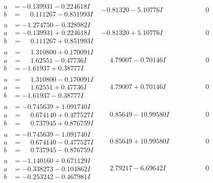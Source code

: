 \documentclass[1p]{elsarticle_modified}
\theoremstyle{definition}
\begin{document}
$$\begin{array}{c|c|c}
\begin{aligned}
a &= -0.139931 - 0.224618 I \\
b &= \phantom{-}0.111267 - 0.851993 I\end{aligned}
 & -0.81320 - 5.10776 I & \phantom{-0.000000 } 0 \\ \hline\begin{aligned}
u &= -1.274750 - 0.328982 I \\
a &= -0.139931 + 0.224618 I \\
b &= \phantom{-}0.111267 + 0.851993 I\end{aligned}
 & -0.81320 + 5.10776 I & \phantom{-0.000000 } 0 \\ \hline\begin{aligned}
u &= \phantom{-}1.310800 + 0.170091 I \\
a &= \phantom{-}1.62551 - 0.47736 I \\
b &= -1.61937 + 0.38777 I\end{aligned}
 & \phantom{-}4.79007 - 0.70146 I & \phantom{-0.000000 } 0 \\ \hline\begin{aligned}
u &= \phantom{-}1.310800 - 0.170091 I \\
a &= \phantom{-}1.62551 + 0.47736 I \\
b &= -1.61937 - 0.38777 I\end{aligned}
 & \phantom{-}4.79007 + 0.70146 I & \phantom{-0.000000 } 0 \\ \hline\begin{aligned}
u &= -0.745639 + 1.091740 I \\
a &= \phantom{-}0.674140 + 0.477527 I \\
b &= \phantom{-}0.737945 + 0.876759 I\end{aligned}
 & \phantom{-}0.85649 - 10.99580 I & \phantom{-0.000000 } 0 \\ \hline\begin{aligned}
u &= -0.745639 - 1.091740 I \\
a &= \phantom{-}0.674140 - 0.477527 I \\
b &= \phantom{-}0.737945 - 0.876759 I\end{aligned}
 & \phantom{-}0.85649 + 10.99580 I & \phantom{-0.000000 } 0 \\ \hline\begin{aligned}
u &= -1.140160 + 0.671129 I \\
a &= -0.338273 - 0.104862 I \\
b &= -0.253242 - 0.467981 I\end{aligned}
 & \phantom{-}2.79217 - 6.69642 I & \phantom{-0.000000 } 0\\

\end{array}$$
\end{document}
